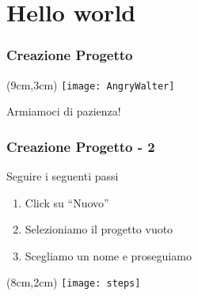 \section{Hello world}
\begin{frame}
  \frametitle{Creazione Progetto}
  
    \begin{textblock*}{5cm}(9cm,3cm)
      \texttt{[image: AngryWalter]}
    \end{textblock*}
    
    \huge Armiamoci di pazienza!
\end{frame}

\begin{frame}

 \frametitle{Creazione Progetto - 2}
 
 Seguire i seguenti passi
 \begin{enumerate}
  \item<1-> Click su ``Nuovo''
  \item<2-> Selezioniamo il progetto vuoto
  \item<3-> Scegliamo un nome e proseguiamo
 \end{enumerate}

 \begin{textblock*}{5cm}(8cm,2cm)
      \texttt{[image: steps]}
 \end{textblock*}
   
\end{frame}
